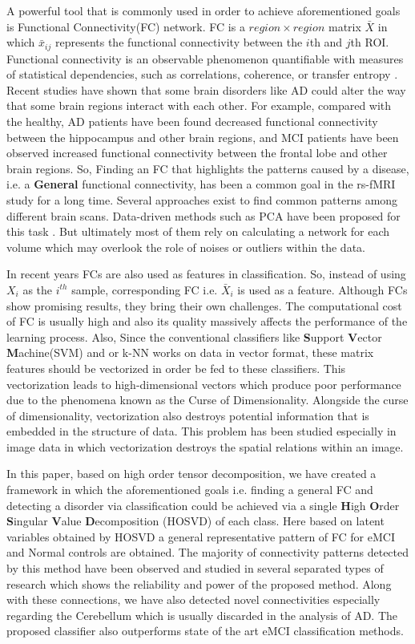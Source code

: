 \documentclass[preprint,12pt]{elsarticle}
\begin{document}
	A powerful tool that is commonly used in order to achieve aforementioned goals is Functional Connectivity(FC) network.  FC is a $region \times region$ matrix $\bar{X}$ in which $\bar{x}_{ij}$ represents the functional connectivity between the $i$th and $j$th ROI. Functional connectivity is an observable
	phenomenon quantifiable with measures of statistical dependencies, such as correlations, coherence, or transfer entropy \cite{r38}.  Recent studies have shown that some brain disorders like AD could alter the way that some brain regions interact with each other. For example, compared with the healthy, AD patients have been found decreased functional connectivity between the hippocampus and other brain regions, and MCI patients have been observed increased functional connectivity between the frontal lobe and other brain regions\cite{r04}.
	So, Finding an FC that highlights the patterns caused by a disease, i.e. a \textbf{General} functional connectivity, has been a common goal in the rs-fMRI study for a long time. Several approaches exist to find common patterns among different brain scans. Data-driven methods such as PCA have been proposed for this task \cite{r55}. But ultimately most of them rely on calculating a network for each volume which may overlook the role of noises or outliers within the data\cite{r53,r54}. 
	
	In recent years FCs are also used as features in classification. 
	So, instead of using $X_i$ as the $i^{th}$ sample,  corresponding  FC i.e. $\bar{X}_i$ is used as a feature. Although FCs show promising results, they bring their own challenges.  The computational cost of FC is usually high and also its quality massively affects the performance of the learning process. Also, Since the conventional classifiers like \textbf{S}upport \textbf{V}ector \textbf{M}achine(SVM) and or k-NN works on data in vector format, these matrix features should be vectorized in order be fed to these classifiers.
	This vectorization leads to high-dimensional vectors which produce poor performance due to the phenomena known as the Curse of Dimensionality. Alongside the curse of dimensionality, vectorization also destroys potential information that is embedded in the structure of data. 
	This problem has been studied especially in image data in which vectorization destroys the spatial relations within an image\cite{r60}.
	
	
	In this paper, based on high order tensor decomposition, we have created a framework in which the aforementioned goals i.e. finding a general FC and detecting a disorder via classification could be achieved via a single \textbf{H}igh \textbf{O}rder \textbf{S}ingular \textbf{V}alue \textbf{D}ecomposition (HOSVD) of each class.
	Here based on latent variables obtained by HOSVD a general representative pattern of FC for eMCI and Normal controls are obtained. 
	The majority of connectivity patterns detected by this method have been observed and studied in several separated types of research which shows the reliability and power of the proposed method. Along with these connections, we have also detected novel connectivities especially regarding the Cerebellum which is usually discarded in the analysis of AD.     
	The proposed classifier also outperforms state of the art eMCI classification methods. 
	
\end{document}
